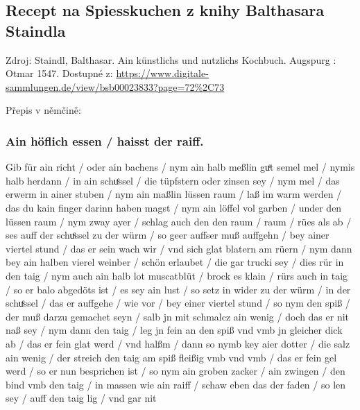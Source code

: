 \subsection{Recept na Spiesskuchen z knihy Balthasara
Staindla}\label{250922-1759}

Zdroj: Staindl, Balthasar. Ain künstlichs und nutzlichs Kochbuch.
Augspurg : Otmar 1547. Dostupné z:
\url{https://www.digitale-sammlungen.de/view/bsb00023833?page=72\%2C73}

Přepis v němčině:

\subsubsection{Ain höflich essen / haisst der
raiff.}\label{250922-1759}

Gib für ain richt / oder ain bachens / nym ain halb meßlin guͤt semel mel
/ nymis halb herdann / in ain schuͤssel / die tüpfstern oder zinsen sey /
nym mel / das erwerm in ainer stuben / nym ain maßlin lüssen raum / laß
im warm werden / das du kain finger darinn haben magst / nym ain löffel
vol garben / under den lüssen raum / nym zway ayer / schlag auch den den
raum / raum / rües als ab / ses auff der schuͤssel zu der würm / so geer
auffser muß auffgehn / bey ainer viertel stund / das er sein wach wir /
vnd sich glat blatern am rüern / nym dann bey ain halben vierel weinber
/ schön erlaubet / die gar trucki sey / dies rür in den taig / nym auch
ain halb lot muscatblüt / brock es klain / rürs auch in taig / so er
balo abgedöts ist / es sey ain lust / so setz in wider zu der würm / in
der schuͤssel / das er auffgehe / wie vor / bey einer viertel stund / so
nym den spiß / der muß darzu gemachet seyn / salb jn mit schmalcz ain
wenig / doch das er nit naß sey / nym dann den taig / leg jn fein an den
spiß vnd vmb jn gleicher dick ab / das er fein glat werd / vnd halßm /
dann so nymb key aier dotter / die salz ain wenig / der streich den taig
am spiß fleißig vmb vnd vmb / das er fein gel werd / so er nun
besprichen ist / so nym ain groben zacker / ain zwingen / den bind vmb
den taig / in massen wie ain raiff / schaw eben das der faden / so len
sey / auff den taig lig / vnd gar nit

